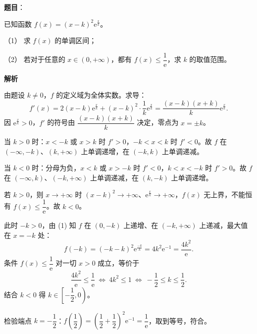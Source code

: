 \begin{answer}

\textbf{题目}：

已知函数 $f(x)=(x-k)^2\mathrm{e}^{\frac xk}$。

（1） 求 $f(x)$ 的单调区间；

（2） 若对于任意的 $x\in(0,+\infty)$，都有 $f(x)\leqslant\dfrac1{\mathrm{e}}$，求 $k$ 的取值范围。

\textbf{解析}

由题设 $k\neq0$，$f$ 的定义域为全体实数。求导：
\nopagebreak[4]
\[
f'(x)=2(x-k)\mathrm{e}^{\frac xk}+(x-k)^2\cdot\frac1k\mathrm{e}^{\frac xk}
=\frac{(x-k)(x+k)}{k}\mathrm{e}^{\frac xk}.
\]
因 $\mathrm{e}^{\frac xk}>0$，$f'$ 的符号由 $\dfrac{(x-k)(x+k)}{k}$ 决定，零点为 $x=\pm k$。


当 $k>0$ 时：$x<-k$ 或 $x>k$ 时 $f'>0$，$-k<x<k$ 时 $f'<0$。故 $f$ 在 $(-\infty,-k)$、$(k,+\infty)$ 上单调递增，在 $(-k,k)$ 上单调递减。

当 $k<0$ 时：分母为负，$x<k$ 或 $x>-k$ 时 $f'<0$，$k<x<-k$ 时 $f'>0$。故 $f$ 在 $(-\infty,k)$、$(-k,+\infty)$ 上单调递减，在 $(k,-k)$ 上单调递增。


若 $k>0$，则 $x\to+\infty$ 时 $(x-k)^2\to+\infty$、$\mathrm{e}^{\frac xk}\to+\infty$，$f(x)$ 无上界，不能恒有 $f(x)\leqslant\dfrac1{\mathrm e}$。故 $k<0$。

此时 $-k>0$，由 (1) 知 $f$ 在 $(0,-k)$ 上递增、在 $(-k,+\infty)$ 上递减，最大值在 $x=-k$ 处：
\nopagebreak[4]
\[
f(-k)=(-k-k)^2\mathrm{e}^{\frac{-k}{k}}=4k^2\mathrm{e}^{-1}=\frac{4k^2}{\mathrm e}.
\]
条件 $f(x)\leqslant\dfrac1{\mathrm e}$ 对一切 $x>0$ 成立，等价于
\nopagebreak[4]
\[
\frac{4k^2}{\mathrm e}\leqslant\frac1{\mathrm e}\ \Longleftrightarrow\ 4k^2\leqslant1\ \Longleftrightarrow\ -\frac12\leqslant k\leqslant\frac12.
\]
结合 $k<0$ 得 $k\in\left[-\dfrac12,0\right)$。

检验端点 $k=-\dfrac12$：$f\left(\dfrac12\right)=\left(\dfrac12+\dfrac12\right)^2\mathrm{e}^{-1}=\dfrac1{\mathrm e}$，取到等号，符合。


\gkanswer{答案（2）：$k\in\left[-\dfrac12,0\right)$。}

\end{answer}
